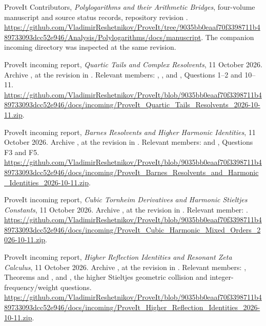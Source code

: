 ProveIt Contributors, \emph{Polylogarithms and their Arithmetic Bridges},
four-volume manuscript and source status records, repository revision
.
\url{https://github.com/VladimirReshetnikov/ProveIt/tree/9035bb0eaaf70f3398711b489733093dcc52e946/Analysis/Polylogarithms/docs/manuscript}.
The companion incoming directory was inspected at the same revision.

ProveIt incoming report, \emph{Quartic Tails and Complex Resolvents},
11 October 2026.
Archive ,
at the revision in \cite{repo:main}.
Relevant members: ,
, and
, Questions 1--2 and 10--11.
\url{https://github.com/VladimirReshetnikov/ProveIt/blob/9035bb0eaaf70f3398711b489733093dcc52e946/docs/incoming/ProveIt_Quartic_Tails_Resolvents_2026-10-11.zip}.

ProveIt incoming report,
\emph{Barnes Resolvents and Higher Harmonic Identities},
11 October 2026.
Archive ,
at the revision in \cite{repo:main}.
Relevant members:  and
, Questions F3 and F5.
\url{https://github.com/VladimirReshetnikov/ProveIt/blob/9035bb0eaaf70f3398711b489733093dcc52e946/docs/incoming/ProveIt_Barnes_Resolvents_and_Harmonic_Identities_2026-10-11.zip}.

ProveIt incoming report,
\emph{Cubic Tornheim Derivatives and Harmonic Stieltjes Constants},
11 October 2026.
Archive ,
at the revision in \cite{repo:main}.
Relevant member: .
\url{https://github.com/VladimirReshetnikov/ProveIt/blob/9035bb0eaaf70f3398711b489733093dcc52e946/docs/incoming/ProveIt_Cubic_Harmonic_Mixed_Orders_2026-10-11.zip}.

ProveIt incoming report,
\emph{Higher Reflection Identities and Resonant Zeta Calculus},
11 October 2026.
Archive ,
at the revision in \cite{repo:main}.
Relevant members: , Theorems
 and , and
, the higher Stieltjes geometric
collision and integer-frequency/weight questions.
\url{https://github.com/VladimirReshetnikov/ProveIt/blob/9035bb0eaaf70f3398711b489733093dcc52e946/docs/incoming/ProveIt_Higher_Reflection_Identities_2026-10-11.zip}.

